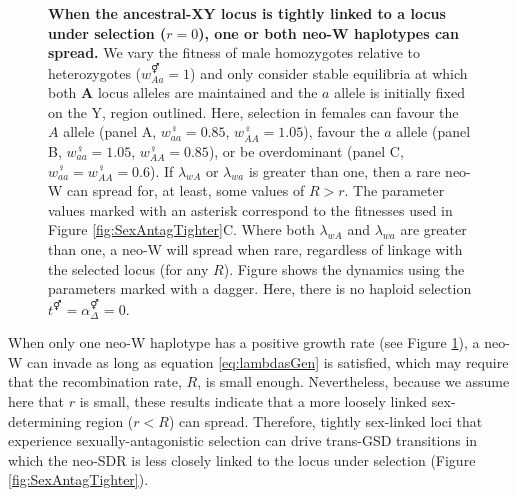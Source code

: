 \documentclass[10pt,letterpaper]{article}
\begin{document}
\begin{figure}[!h]
\centering
\caption{
{\bf When the ancestral-XY locus is tightly linked to a locus under selection ($r=0$), one or both neo-W haplotypes can spread. }
We vary the fitness of male homozygotes relative to heterozygotes ($w_{Aa}^\Hermaphrodite=1$) and only consider stable equilibria at which both \textbf{A} locus alleles are maintained and the $a$ allele is initially fixed on the Y, region outlined. 
Here, selection in females can favour the $A$ allele (panel A, $w_{aa}^\female=0.85$, $w_{AA}^\female=1.05$), favour the $a$ allele (panel B, $w_{aa}^\female=1.05$, $w_{AA}^\female=0.85$), or be overdominant (panel C, $w_{aa}^\female=w_{AA}^\female=0.6$). 
If $\lambda_{wA}$ or $\lambda_{wa}$ is greater than one, then a rare neo-W can spread for, at least, some values of $R>r$. 
The parameter values marked with an asterisk correspond to the fitnesses used in Figure \ref{fig:SexAntagTighter}C. 
Where both $\lambda_{wA}$ and $\lambda_{wa}$ are greater than one, a neo-W will spread when rare, regardless of linkage with the selected locus (for any $R$). 
Figure  shows the dynamics using the parameters marked with a dagger. 
Here, there is no haploid selection $t^\Hermaphrodite = \alpha^\Hermaphrodite_\Delta = 0$.
}
\label{fig:regionplots}
\end{figure}




When only one neo-W haplotype has a positive growth rate (see Figure \ref{fig:regionplots}), a neo-W can invade as long as equation \eqref{eq:lambdasGen} is satisfied, which may require that the recombination rate, $R$, is small enough.
Nevertheless, because we assume here that $r$ is small, these results indicate that a more loosely linked sex-determining region ($r<R$) can spread.
Therefore, tightly sex-linked loci that experience sexually-antagonistic selection can drive trans-GSD transitions in which the neo-SDR is less closely linked to the locus under selection (Figure \ref{fig:SexAntagTighter}). 
\end{document}
